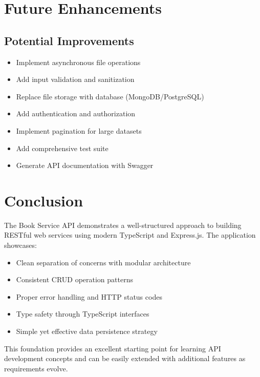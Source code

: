 \documentclass[11pt,a4paper]{article}
\begin{document}
\section{Future Enhancements}

\subsection{Potential Improvements}
\begin{itemize}
    \item Implement asynchronous file operations
    \item Add input validation and sanitization
    \item Replace file storage with database (MongoDB/PostgreSQL)
    \item Add authentication and authorization
    \item Implement pagination for large datasets
    \item Add comprehensive test suite
    \item Generate API documentation with Swagger
\end{itemize}

\section{Conclusion}

The Book Service API demonstrates a well-structured approach to building RESTful web services using modern TypeScript and Express.js. The application showcases:

\begin{itemize}
    \item Clean separation of concerns with modular architecture
    \item Consistent CRUD operation patterns
    \item Proper error handling and HTTP status codes
    \item Type safety through TypeScript interfaces
    \item Simple yet effective data persistence strategy
\end{itemize}

This foundation provides an excellent starting point for learning API development concepts and can be easily extended with additional features as requirements evolve.
\end{document}
